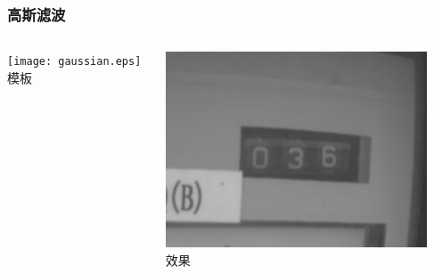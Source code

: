 \documentclass[12pt,hyperref={CJKbookmarks=true}]{beamer}
\begin{document}
\begin{frame}
  \frametitle{高斯滤波}
  \begin{columns}[onlytextwidth]
    \begin{column}{0.5\textwidth}
      \centering
      \texttt{[image: gaussian.eps]}\\
      \footnotesize 模板
    \end{column}
    \begin{column}{0.5\textwidth}
      \centering
      \includegraphics[width=0.9\textwidth]{gaussian.png}\\
      \footnotesize 效果
    \end{column}
  \end{columns}
\end{frame}
\end{document}
